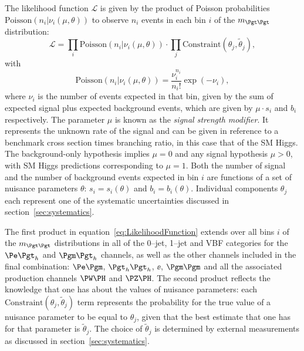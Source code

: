 The likelihood function $\mathcal{L}$ is given by the product of Poisson probabilities 
$\mathrm{Poisson}(n_{i} \vert \nu_{i}(\mu, \theta))$ to observe $n_{i}$ events in each bin
$i$ of the $m_{\Pgt\Pgt}$ distribution:
\begin{equation}
\mathcal{L} = \prod_{i} \mathrm{Poisson}(n_{i} \vert \nu_{i}(\mu, \theta)) \cdot
\prod_{j} \mathrm{Constraint}(\theta_{j}, \tilde{\theta}_{j}),
\label{eq:LikelihoodFunction}
\end{equation}
with
\begin{equation}
\mathrm{Poisson} ( n_{i} \vert \nu_{i}(\mu, \theta )) = \frac{\nu_{i}^{n_{i}}}{n_{i}!} \exp ( -\nu_{i} ),
\label{eq:PoissonDistribution}
\end{equation}
where $\nu_{i}$ is the number of events expected in that bin,
given by the sum of expected signal plus expected background events,
which are given by $\mu \cdot s_{i}$ and $b_{i}$ respectively.
The parameter $\mu$ is known as the \emph{signal strength modifier}. 
It represents the unknown rate of the signal and can be given in reference to a
benchmark cross section times branching ratio, in this case that of the \ac{SM}
Higgs. The background-only hypothesis implies $\mu = 0$ and any signal hypothesis $
\mu > 0$, with \ac{SM} Higgs predictions corresponding to $\mu = 1$.
Both the number of signal and the number of background events expected in bin $i$ 
are functions of a set of nuisance parameters $\theta$:
$s_{i} = s_{i} ( \theta )$ and $b_{i} = b_{i} ( \theta )$.
Individual components $\theta_{j}$ each represent one of the systematic uncertainties
discussed in section~\ref{sec:systematics}.

The first product in equation~\ref{eq:LikelihoodFunction} extends over all bins $i$
of the $m_{\Pgt\Pgt}$ distributions in all of the 0--jet, 1--jet and VBF categories 
for the $\etau$ and $\mutau$ channels, as well as the other channels included in
the final combination: $\emu$, $\tautau$, $\ee$, $\mumu$ and all the
associated production channels $\PW\PH$ and $\PZ\PH$. 
The second product reflects the knowledge that one has about the values of nuisance parameters:
each $\mathrm{Constraint}(\theta_{j}, \tilde{\theta}_{j})$ 
term represents the probability for the true value of a nuisance parameter to be equal to $\theta_{j}$,
given that the best estimate that one has for that parameter is
$\tilde{\theta}_{j}$. The choice of $\tilde{\theta}_{j}$ is determined by
external measurements as discussed in section~\ref{sec:systematics}.

